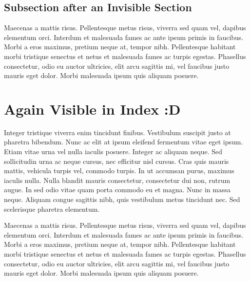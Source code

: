 \documentclass[11pt,letterpaper]{book}
\begin{document}
\subsection{Subsection after an Invisible Section}
\noindent Maecenas a mattis risus. Pellentesque metus risus, viverra sed quam vel, dapibus elementum orci. Interdum et malesuada fames ac ante ipsum primis in faucibus. Morbi a eros maximus, pretium neque at, tempor nibh. Pellentesque habitant morbi tristique senectus et netus et malesuada fames ac turpis egestas. Phasellus consectetur, odio eu auctor ultricies, elit arcu sagittis mi, vel faucibus justo mauris eget dolor. Morbi malesuada ipsum quis aliquam posuere. 

\section{Again Visible in Index :D}
\noindent  Integer tristique viverra enim tincidunt finibus. Vestibulum suscipit justo at pharetra bibendum. Nunc ac elit at ipsum eleifend fermentum vitae eget ipsum. Etiam vitae urna vel nulla iaculis posuere. Integer ac aliquam neque. Sed sollicitudin urna ac neque cursus, nec efficitur nisl cursus. Cras quis mauris mattis, vehicula turpis vel, commodo turpis. In ut accumsan purus, maximus iaculis nulla. Nulla blandit mauris consectetur, consectetur dui non, rutrum augue. In sed odio vitae quam porta commodo eu et magna. Nunc in massa neque. Aliquam congue sagittis nibh, quis vestibulum metus tincidunt nec. Sed scelerisque pharetra elementum.

Maecenas a mattis risus. Pellentesque metus risus, viverra sed quam vel, dapibus elementum orci. Interdum et malesuada fames ac ante ipsum primis in faucibus. Morbi a eros maximus, pretium neque at, tempor nibh. Pellentesque habitant morbi tristique senectus et netus et malesuada fames ac turpis egestas. Phasellus consectetur, odio eu auctor ultricies, elit arcu sagittis mi, vel faucibus justo mauris eget dolor. Morbi malesuada ipsum quis aliquam posuere. 
\end{document}
